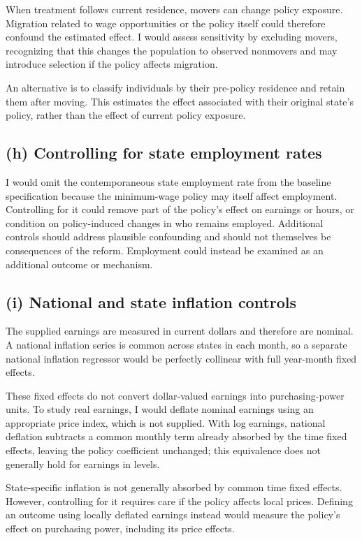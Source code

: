 \documentclass[12pt]{article}
\begin{document}
When treatment follows current residence, movers can change policy exposure. Migration related to wage opportunities or the policy itself could therefore confound the estimated effect. I would assess sensitivity by excluding movers, recognizing that this changes the population to observed nonmovers and may introduce selection if the policy affects migration.

An alternative is to classify individuals by their pre-policy residence and retain them after moving. This estimates the effect associated with their original state’s policy, rather than the effect of current policy exposure.
\subsection*{(h) Controlling for state employment rates}
I would omit the contemporaneous state employment rate from the baseline specification because the minimum-wage policy may itself affect employment. Controlling for it could remove part of the policy’s effect on earnings or hours, or condition on policy-induced changes in who remains employed. Additional controls should address plausible confounding and should not themselves be consequences of the reform. Employment could instead be examined as an additional outcome or mechanism. 
\subsection*{(i) National and state inflation controls}
The supplied earnings are measured in current dollars and therefore are nominal. A national inflation series is common across states in each month, so a separate national inflation regressor would be perfectly collinear with full year-month fixed effects.

These fixed effects do not convert dollar-valued earnings into purchasing-power units. To study real earnings, I would deflate nominal earnings using an appropriate price index, which is not supplied. With log earnings, national deflation subtracts a common monthly term already absorbed by the time fixed effects, leaving the policy coefficient unchanged; this equivalence does not generally hold for earnings in levels.

State-specific inflation is not generally absorbed by common time fixed effects. However, controlling for it requires care if the policy affects local prices. Defining an outcome using locally deflated earnings instead would measure the policy’s effect on purchasing power, including its price effects.
\end{document}
